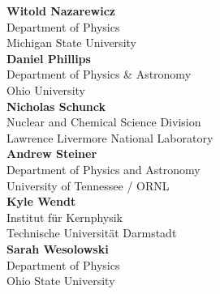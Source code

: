 \begin{minipage}[t]{0.5\linewidth}

\textbf{Witold Nazarewicz}\\
Department of Physics\\
Michigan State University\\

\textbf{Daniel Phillips}\\
Department of Physics \& Astronomy\\
Ohio University\\

{\bf Nicholas Schunck}\\
Nuclear and Chemical Science Division \\
Lawrence Livermore National Laboratory\\

{\bf Andrew Steiner}\\
Department of Physics and Astronomy\\
University of Tennessee / ORNL\\

{\bf Kyle Wendt}\\
Institut für Kernphysik\\
Technische Universität Darmstadt \\

\textbf{Sarah Wesolowski}\\
Department of Physics\\ 
Ohio State University\\

\end{minipage}

